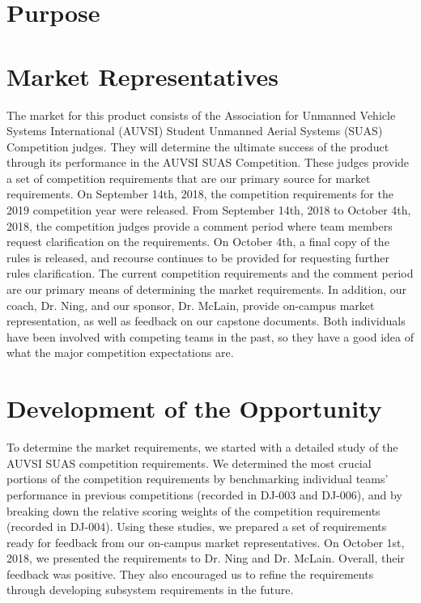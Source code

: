 \documentclass[]{auvsi_doc}
\begin{document}
\begin{AUVSITitlePage}

\begin{artifacttable}
\end{artifacttable}

\end{AUVSITitlePage}

\section{Purpose}
\section{Market Representatives}
The market for this product consists of the Association for Unmanned Vehicle Systems International (AUVSI) Student Unmanned Aerial Systems (SUAS) Competition judges.
They will determine the ultimate success of the product through its performance in the AUVSI SUAS Competition.
These judges provide a set of competition requirements that are our primary source for market requirements.
On September 14th, 2018, the competition requirements for the 2019 competition year were released.
From September 14th, 2018 to October 4th, 2018, the competition judges provide a comment period where team members request clarification on the requirements. On October 4th, a final copy of the rules is released, and recourse continues to be provided for requesting further rules clarification.
The current competition requirements and the comment period are our primary means of determining the market requirements.
In addition, our coach, Dr. Ning, and our sponsor, Dr. McLain, provide on-campus market representation, as well as feedback on our capstone documents. Both individuals have been involved with competing teams in the past, so they have a good idea of what the major competition expectations are.

\section{Development of the Opportunity}

To determine the market requirements, we started with a detailed study of the AUVSI SUAS competition requirements.
We determined the most crucial portions of the competition requirements by benchmarking individual teams' performance in previous competitions (recorded in DJ-003 and DJ-006), and by breaking down the relative scoring weights of the competition requirements (recorded in DJ-004). 
Using these studies, we prepared a set of requirements ready for feedback from our on-campus market representatives.
On October 1st, 2018, we presented the requirements to Dr. Ning and Dr. McLain.
Overall, their feedback was positive. They also encouraged us to refine the requirements through developing subsystem requirements in the future.
\end{document}
